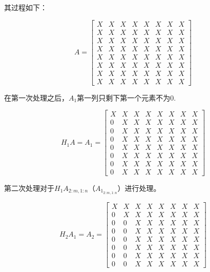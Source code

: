 其过程如下：


$$ A=\left[\begin{array}{llllllll}X & X & X & X & X & X & X & X \\ X & X & X & X & X & X & X & X \\ X & X & X & X & X & X & X & X \\ X & X & X & X & X & X & X & X \\ X & X & X & X & X & X & X & X \\ X & X & X & X & X & X & X & X \\ X & X & X & X & X & X & X & X \\ X & X & X & X & X & X & X & X\end{array}\right] $$

在第一次处理之后，$A_1$第一列只剩下第一个元素不为0.

$$H_1A = A_{1}=\left[\begin{array}{llllllll}X & X & X & X & X & X & X & X \\ 0 & X & X & X & X & X & X & X \\ 0 & X & X & X & X & X & X & X \\ 0 & X & X & X & X & X & X & X \\ 0 & X & X & X & X & X & X & X \\ 0 & X & X & X & X & X & X & X \\ 0 & X & X & X & X & X & X & X \\ 0 & X & X & X & X & X & X & X\end{array}\right] $$

第二次处理对于$H_1A_{2:m, 1:n}$（$A_{1_{2:m, 1:n} }  $）进行处理。

$$H_2A_1= A_{2}=\left[\begin{array}{cccccccc}X & X & X & X & X & X & X & X \\ 0 & X & X & X & X & X & X & X \\ 0 & 0 & X & X & X & X & X & X \\ 0 & 0 & X & X & X & X & X & X \\ 0 & 0 & X & X & X & X & X & X \\ 0 & 0 & X & X & X & X & X & X \\ 0 & 0 & X & X & X & X & X & X \\ 0 & 0 & X & X & X & X & X & X\end{array}\right] $$




